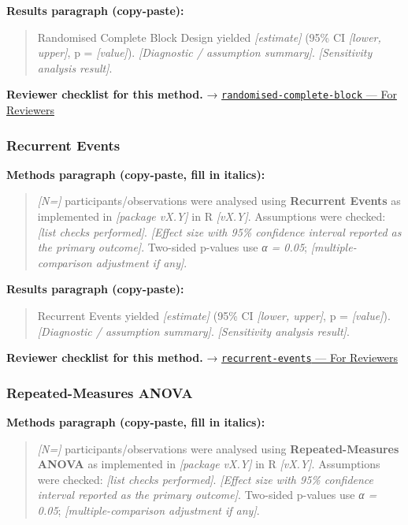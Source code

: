 \documentclass[
]{article}
\begin{document}
\textbf{Results paragraph (copy-paste):}

\begin{quote}
Randomised Complete Block Design yielded \emph{{[}estimate{]}} (95\% CI
\emph{{[}lower, upper{]}}, p = \emph{{[}value{]}}). \emph{{[}Diagnostic
/ assumption summary{]}}. \emph{{[}Sensitivity analysis result{]}}.
\end{quote}

\textbf{Reviewer checklist for this method.} →
\href{../chapters/16-design/randomised-complete-block.Rmd\#for-reviewers}{\texttt{randomised-complete-block}
--- For Reviewers}

\subsubsection{Recurrent Events}\label{recurrent-events}

\textbf{Methods paragraph (copy-paste, fill in italics):}

\begin{quote}
\emph{{[}N={]}} participants/observations were analysed using
\textbf{Recurrent Events} as implemented in \emph{{[}package vX.Y{]}} in
R \emph{{[}vX.Y{]}}. Assumptions were checked: \emph{{[}list checks
performed{]}}. \emph{{[}Effect size with 95\% confidence interval
reported as the primary outcome{]}}. Two-sided p-values use \emph{α =
0.05}; \emph{{[}multiple-comparison adjustment if any{]}}.
\end{quote}

\textbf{Results paragraph (copy-paste):}

\begin{quote}
Recurrent Events yielded \emph{{[}estimate{]}} (95\% CI \emph{{[}lower,
upper{]}}, p = \emph{{[}value{]}}). \emph{{[}Diagnostic / assumption
summary{]}}. \emph{{[}Sensitivity analysis result{]}}.
\end{quote}

\textbf{Reviewer checklist for this method.} →
\href{../chapters/11-survival/recurrent-events.Rmd\#for-reviewers}{\texttt{recurrent-events}
--- For Reviewers}

\subsubsection{Repeated-Measures ANOVA}\label{repeated-measures-anova}

\textbf{Methods paragraph (copy-paste, fill in italics):}

\begin{quote}
\emph{{[}N={]}} participants/observations were analysed using
\textbf{Repeated-Measures ANOVA} as implemented in \emph{{[}package
vX.Y{]}} in R \emph{{[}vX.Y{]}}. Assumptions were checked: \emph{{[}list
checks performed{]}}. \emph{{[}Effect size with 95\% confidence interval
reported as the primary outcome{]}}. Two-sided p-values use \emph{α =
0.05}; \emph{{[}multiple-comparison adjustment if any{]}}.
\end{quote}
\end{document}
